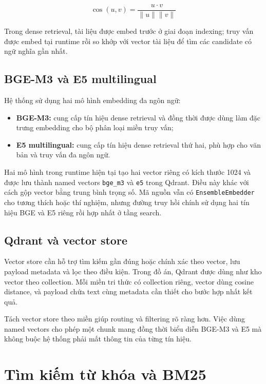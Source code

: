 \documentclass[../DoAn.tex]{subfiles}
\begin{document}
\begin{equation}
\operatorname{cos}(u,v) =
\frac{u \cdot v}{\|u\| \|v\|}
\end{equation}

Trong dense retrieval, tài liệu được embed trước ở giai đoạn indexing; truy vấn
được embed tại runtime rồi so khớp với vector tài liệu để tìm các candidate có
ngữ nghĩa gần nhất.

\subsection{BGE-M3 và E5 multilingual}

Hệ thống sử dụng hai mô hình embedding đa ngôn ngữ:

\begin{itemize}
    \item \textbf{BGE-M3:} cung cấp tín hiệu dense retrieval và đồng thời được
    dùng làm đặc trưng embedding cho bộ phân loại miền truy vấn;
    \item \textbf{E5 multilingual:} cung cấp tín hiệu dense retrieval thứ hai,
    phù hợp cho văn bản và truy vấn đa ngôn ngữ.
\end{itemize}

Hai mô hình trong runtime hiện tại tạo hai vector riêng có kích thước 1024 và
được lưu thành named vectors \texttt{bge\_m3} và \texttt{e5} trong Qdrant. Điều
này khác với cách gộp vector bằng trung bình trọng số. Mã nguồn vẫn có
\texttt{EnsembleEmbedder} cho tương thích hoặc thí nghiệm, nhưng đường truy hồi
chính sử dụng hai tín hiệu BGE và E5 riêng rồi hợp nhất ở tầng search.

\subsection{Qdrant và vector store}

Vector store cần hỗ trợ tìm kiếm gần đúng hoặc chính xác theo vector, lưu payload
metadata và lọc theo điều kiện. Trong đồ án, Qdrant được dùng như kho vector theo
collection. Mỗi miền tri thức có collection riêng, vector dùng cosine distance,
và payload chứa text cùng metadata cần thiết cho bước hợp nhất kết quả.

Tách vector store theo miền giúp routing và filtering rõ ràng hơn. Việc dùng named
vectors cho phép một chunk mang đồng thời biểu diễn BGE-M3 và E5 mà không buộc hệ
thống phải mất thông tin của từng tín hiệu.

\section{Tìm kiếm từ khóa và BM25}
\end{document}
